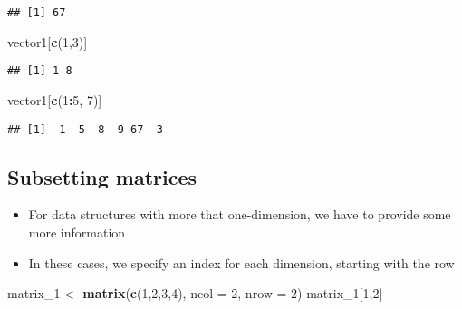 \documentclass[]{article}
\newenvironment{Shaded}{\begin{snugshade}}{\end{snugshade}}
\newcommand{\KeywordTok}[1]{\textcolor[rgb]{0.13,0.29,0.53}{\textbf{#1}}}
\newcommand{\DataTypeTok}[1]{\textcolor[rgb]{0.13,0.29,0.53}{#1}}
\newcommand{\DecValTok}[1]{\textcolor[rgb]{0.00,0.00,0.81}{#1}}
\newcommand{\StringTok}[1]{\textcolor[rgb]{0.31,0.60,0.02}{#1}}
\newcommand{\OperatorTok}[1]{\textcolor[rgb]{0.81,0.36,0.00}{\textbf{#1}}}
\newcommand{\NormalTok}[1]{#1}
\providecommand{\tightlist}{%
  \setlength{\itemsep}{0pt}\setlength{\parskip}{0pt}}
\begin{document}
\begin{verbatim}
## [1] 67
\end{verbatim}

\begin{Shaded}
\begin{Highlighting}[]
\NormalTok{vector1[}\KeywordTok{c}\NormalTok{(}\DecValTok{1}\NormalTok{,}\DecValTok{3}\NormalTok{)]}
\end{Highlighting}
\end{Shaded}

\begin{verbatim}
## [1] 1 8
\end{verbatim}

\begin{Shaded}
\begin{Highlighting}[]
\NormalTok{vector1[}\KeywordTok{c}\NormalTok{(}\DecValTok{1}\OperatorTok{:}\DecValTok{5}\NormalTok{, }\DecValTok{7}\NormalTok{)]}
\end{Highlighting}
\end{Shaded}

\begin{verbatim}
## [1]  1  5  8  9 67  3
\end{verbatim}

\subsection{Subsetting matrices}\label{subsetting-matrices}

\begin{itemize}
\tightlist
\item
  For data structures with more that one-dimension, we have to provide
  some more information
\item
  In these cases, we specify an index for each dimension, starting with
  the row
\end{itemize}

\begin{Shaded}
\begin{Highlighting}[]
\NormalTok{matrix_}\DecValTok{1}\NormalTok{ <-}\StringTok{ }\KeywordTok{matrix}\NormalTok{(}\KeywordTok{c}\NormalTok{(}\DecValTok{1}\NormalTok{,}\DecValTok{2}\NormalTok{,}\DecValTok{3}\NormalTok{,}\DecValTok{4}\NormalTok{), }\DataTypeTok{ncol =} \DecValTok{2}\NormalTok{, }\DataTypeTok{nrow =} \DecValTok{2}\NormalTok{)}
\NormalTok{matrix_}\DecValTok{1}\NormalTok{[}\DecValTok{1}\NormalTok{,}\DecValTok{2}\NormalTok{]}
\end{Highlighting}
\end{Shaded}
\end{document}

